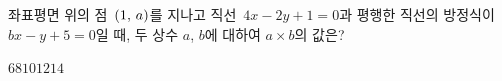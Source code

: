 좌표평면 위의 점~$(1,\mkern3mu a)$를 지나고 직선~$4x-2y+1=0$과 평행한 직선의 방정식이 $bx-y+5=0$일 때, 두 상수 $a$, $b$에 대하여 $a\times b$의 값은?
\begin{choices32}{$6$}{$8$}{$10$}{$12$}{$14$}\end{choices32}
